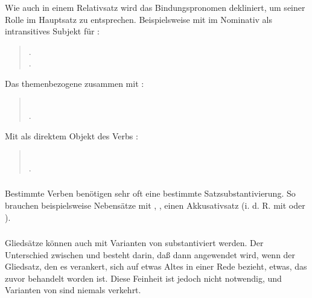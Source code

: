 \subsubsection{} Wie auch in einem Relativsatz wird das Bindungspronomen dekliniert,
um seiner Rolle im Hauptsatz zu entsprechen. Beispielsweise mit  im Nominativ als
intransitives Subjekt f\"ur :

\begin{quotation}
\noindent{}.\\
\indent{}.
\end{quotation}

\noindent Das themenbezogene  zusammen mit :
\begin{quotation}
\noindent{}\\
\indent{}.
\end{quotation}

\noindent Mit  als direktem Objekt des Verbs :
\begin{quotation}
\noindent{}\\
\indent{}.
\end{quotation}

\subsubsection{} Bestimmte Verben ben\"otigen sehr oft eine bestimmte Satzsubstantivierung.
So brauchen beispielsweise Nebens\"atze mit , , einen Akkusativsatz
(i. d. R. mit  oder ).

\subsubsection{} Glieds\"atze k\"onnen auch mit Varianten von  substantiviert
werden. Der Unterschied zwischen  und  besteht darin, da\ss{} 
dann angewendet wird, wenn der Gliedsatz, den es verankert, sich auf etwas Altes in einer
Rede bezieht, etwas, das zuvor behandelt worden ist. Diese Feinheit ist jedoch nicht
notwendig, und Varianten von  sind niemals verkehrt.

